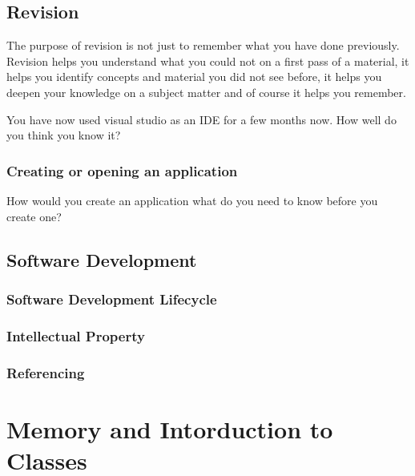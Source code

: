 \documentclass[
]{book}
\theoremstyle{definition}
\theoremstyle{definition}
\theoremstyle{definition}
\theoremstyle{remark}
\begin{document}
\hypertarget{revision}{%
\section{Revision}\label{revision}}

The purpose of revision is not just to remember what you have done previously. Revision helps you understand what you could not on a first pass of a material, it helps you identify concepts and material you did not see before, it helps you deepen your knowledge on a subject matter and of course it helps you remember.

You have now used visual studio as an IDE for a few months now. How well do you think you know it?

\hypertarget{creating-or-opening-an-application}{%
\subsection{Creating or opening an application}\label{creating-or-opening-an-application}}

How would you create an application what do you need to know before you create one?

\hypertarget{software-development}{%
\section{Software Development}\label{software-development}}

\hypertarget{software-development-lifecycle}{%
\subsection{Software Development Lifecycle}\label{software-development-lifecycle}}

\hypertarget{intellectual-property}{%
\subsection{Intellectual Property}\label{intellectual-property}}

\hypertarget{referencing}{%
\subsection{Referencing}\label{referencing}}

\hypertarget{memory-and-intorduction-to-classes}{%
\chapter{Memory and Intorduction to Classes}\label{memory-and-intorduction-to-classes}}
\end{document}
